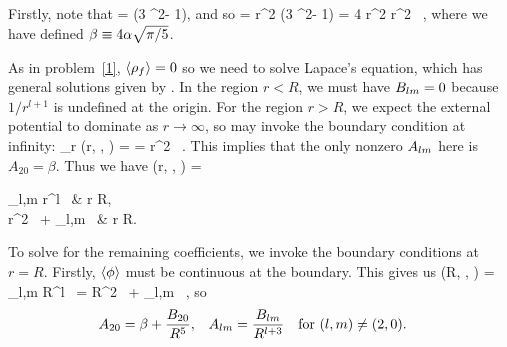 \begin{solution}
	Firstly, note that
	\beq
		\Ytotv =   (3 \cos^2\tht - 1),
	\eeq
	and so
	\beq
		\phio = \alp r^2 (3 \cos^2\tht - 1) = 4 \alp r^2  \Ytotv \equiv \beta r^2 \, \Ytotv,
	\eeq
	where we have defined $\beta \equiv 4 \alpha \sqrt{\pi/5}$.

	As in problem~\ref{1}, $\evrhof = 0$ so we need to solve Lapace's equation, which has general solutions given by .  In the region $r < R$, we must have $B_{l m} = 0$ because $1/r^{l+1}$ is undefined at the origin.  For the region $r > R$, we expect the external potential to dominate as $r \to \infty$, so may invoke the boundary condition at infinity:
	\beq
		\lim_{r \to \infty} \phi(r, \tht, \vph) = \phio = \beta r^2 \, \Ytotv.
	\eeq
	This implies that the only nonzero $A_{l m}$ here is $A_{2 0} = \beta$.  Thus we have
	\beq
		\evphi\!(r, \tht, \vph) = \begin{cases}
			\dsum_{l,m} \Alm r^l \, \Ylm\tv & \tif r \leq R, \\[2ex]
			\beta r^2 \, \Ytotv + \dsum_{l,m}  \, \Ylm\tv & \tif r \geq R.
		\end{cases}
	\eeq
	
	To solve for the remaining coefficients, we invoke the boundary conditions at $r = R$.  Firstly, $\evphi$ must be continuous at the boundary.  This gives us
	\beq
		\evphi\!(R, \tht, \vph) = \sum_{l,m} \Alm R^l \, \Ylm\tv = \beta R^2 \, \Ytotv + \sum_{l,m}  \, \Ylm\tv,
	\eeq
	so
	\begin{align} \label{c1}
		A_{2 0} &= \beta + \dfrac{B_{2 0}}{R^{5}}, &
		A_{l m} &= \frac{B_{l m}}{R^{l+3}} \quad \text{for } (l,m) \neq (2,0).
	\end{align}
	

\end{solution}

